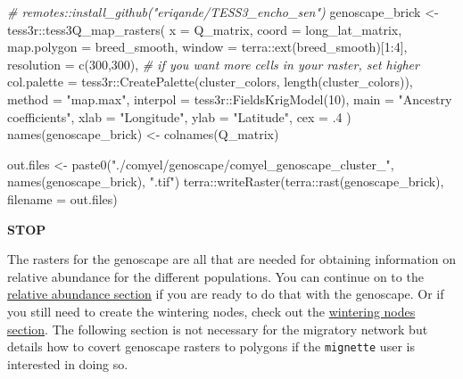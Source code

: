 \documentclass[
]{book}
\newenvironment{Shaded}{\begin{snugshade}}{\end{snugshade}}
\newcommand{\AttributeTok}[1]{\textcolor[rgb]{0.77,0.63,0.00}{#1}}
\newcommand{\CommentTok}[1]{\textcolor[rgb]{0.56,0.35,0.01}{\textit{#1}}}
\newcommand{\DecValTok}[1]{\textcolor[rgb]{0.00,0.00,0.81}{#1}}
\newcommand{\FunctionTok}[1]{\textcolor[rgb]{0.00,0.00,0.00}{#1}}
\newcommand{\NormalTok}[1]{#1}
\newcommand{\OtherTok}[1]{\textcolor[rgb]{0.56,0.35,0.01}{#1}}
\newcommand{\SpecialCharTok}[1]{\textcolor[rgb]{0.00,0.00,0.00}{#1}}
\newcommand{\StringTok}[1]{\textcolor[rgb]{0.31,0.60,0.02}{#1}}
\begin{document}
\begin{Shaded}
\begin{Highlighting}[]
\CommentTok{\# remotes::install\_github("eriqande/TESS3\_encho\_sen")}
\NormalTok{genoscape\_brick }\OtherTok{\textless{}{-}}\NormalTok{ tess3r}\SpecialCharTok{::}\FunctionTok{tess3Q\_map\_rasters}\NormalTok{(}
  \AttributeTok{x =}\NormalTok{ Q\_matrix, }
  \AttributeTok{coord =}\NormalTok{ long\_lat\_matrix,  }
  \AttributeTok{map.polygon =}\NormalTok{ breed\_smooth,}
  \AttributeTok{window =}\NormalTok{ terra}\SpecialCharTok{::}\FunctionTok{ext}\NormalTok{(breed\_smooth)[}\DecValTok{1}\SpecialCharTok{:}\DecValTok{4}\NormalTok{],}
  \AttributeTok{resolution =} \FunctionTok{c}\NormalTok{(}\DecValTok{300}\NormalTok{,}\DecValTok{300}\NormalTok{), }\CommentTok{\# if you want more cells in your raster, set higher}
  \AttributeTok{col.palette =}\NormalTok{ tess3r}\SpecialCharTok{::}\FunctionTok{CreatePalette}\NormalTok{(cluster\_colors, }\FunctionTok{length}\NormalTok{(cluster\_colors)), }
  \AttributeTok{method =} \StringTok{"map.max"}\NormalTok{, }
  \AttributeTok{interpol =}\NormalTok{ tess3r}\SpecialCharTok{::}\FunctionTok{FieldsKrigModel}\NormalTok{(}\DecValTok{10}\NormalTok{),  }
  \AttributeTok{main =} \StringTok{"Ancestry coefficients"}\NormalTok{,}
  \AttributeTok{xlab =} \StringTok{"Longitude"}\NormalTok{, }
  \AttributeTok{ylab =} \StringTok{"Latitude"}\NormalTok{, }
  \AttributeTok{cex =}\NormalTok{ .}\DecValTok{4}
\NormalTok{)}
\FunctionTok{names}\NormalTok{(genoscape\_brick) }\OtherTok{\textless{}{-}} \FunctionTok{colnames}\NormalTok{(Q\_matrix)}

\NormalTok{out.files }\OtherTok{\textless{}{-}} \FunctionTok{paste0}\NormalTok{(}\StringTok{"./comyel/genoscape/comyel\_genoscape\_cluster\_"}\NormalTok{, }\FunctionTok{names}\NormalTok{(genoscape\_brick), }\StringTok{".tif"}\NormalTok{)}
\NormalTok{terra}\SpecialCharTok{::}\FunctionTok{writeRaster}\NormalTok{(terra}\SpecialCharTok{::}\FunctionTok{rast}\NormalTok{(genoscape\_brick), }\AttributeTok{filename =}\NormalTok{ out.files)}
\end{Highlighting}
\end{Shaded}

\textbf{STOP}

The rasters for the genoscape are all that are needed for obtaining information on relative abundance for the different populations. You can continue on to the \protect\hyperlink{abundance}{relative abundance section} if you are ready to do that with the genoscape. Or if you still need to create the wintering nodes, check out the \protect\hyperlink{wintering}{wintering nodes section}. The following section is not necessary for the migratory network but details how to covert genoscape rasters to polygons if the \texttt{mignette} user is interested in doing so.
\end{document}
